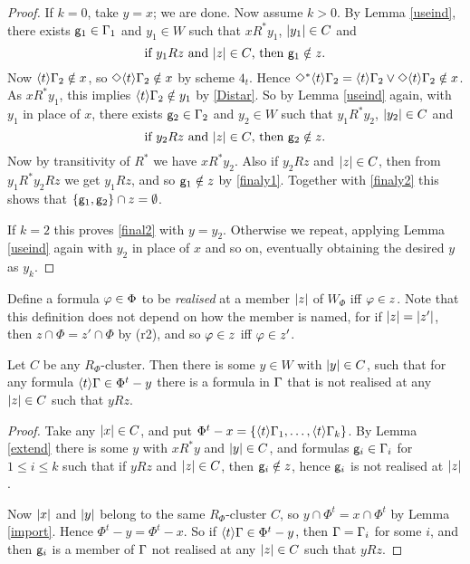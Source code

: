 \begin{proof}
If $k=0$, take $y=x$; we are done.
Now assume $k>0$.
By Lemma \ref{useind}, there exists ${\sf g}_1\in\Gamma_1$ and $y_1\in W$ such that $xR^*y_1$, $|y_1|\in C$ and
\begin{equation} \label{finaly1}
\text{if $y_1Rz$ and $\ab{z}\in C$, then $\g_1\notin z$.}
\end{equation}
Now $\langle t\rangle\Gamma_2\notin x$, so $\Diamond\langle t\rangle\Gamma_2\notin x$ by scheme $4_t$.
Hence $\Diamond^*\langle t\rangle\Gamma_2=\langle t\rangle\Gamma_2\lor\Diamond\langle t\rangle\Gamma_2\notin x$. As
$xR^*y_1$, this implies  $\langle t\rangle\Gamma_2\notin y_1$ by \eqref{Distar}.
So by Lemma \ref{useind} again, with $y_1$ in place of $x$, there exists ${\sf g}_2\in\Gamma_2$ and $y_2\in W$ such that $y_1R^*y_2$, 
$|y_2|\in C$ and
\begin{equation} \label{finaly2}
\text{if $y_2Rz$ and $\ab{z}\in C$, then $\g_2\notin z$.}
\end{equation}
Now by transitivity of $R^*$ we have $xR^*y_2$. Also if $y_2Rz$ and $|z|\in C$, then from  $y_1R^*y_2Rz$ we get $y_1Rz$, and so ${\sf g}_1\notin z$ by \eqref{finaly1}. Together with \eqref{finaly2} this shows that  $\{{\sf g}_1,{\sf g}_2\}\cap z=\emptyset$.

If $k=2$ this proves \eqref{final2} with $y=y_2$. Otherwise we repeat, applying Lemma \ref{useind} again with $y_2$ in place of $x$ and so on, eventually obtaining the desired $y$ as $y_k$.
\end{proof}

Define a formula $\varphi\in\Phi$ to be \emph{realised} at a member $|z|$ of $W_\Phi$ iff $\varphi\in z$. 
Note that this definition does not depend on how the member is  named, for if $|z|=|z'|$, then $z\cap\Phi=z'\cap\Phi$ by (r2), and so $\varphi\in z$ iff $\varphi\in z'$.

\begin{lemma}\label{notreal}
Let   $C$ be any $R_\Phi$-cluster. Then there is some $y\in W$ with $|y|\in C$, such that for any formula 
$\langle t\rangle\Gamma\in \Phi^t-y$ there is a formula in $\Gamma$ that is not realised at any $|z|\in C$ such that $yRz$.
\end{lemma}
\begin{proof}
Take any $|x|\in C$, and put
 $\Phi^t-x=\{\langle t\rangle\Gamma_1,\dots,\langle t\rangle\Gamma_k\}$. By Lemma \ref{extend} there is some $y$ with $xR^*y$ and $|y|\in C$, and  formulas ${\sf g}_i\in\Gamma_i$ for $1\leq i\leq k$ such that if $yRz$ and $|z|\in C$, then ${\sf g}_i\notin z$, hence ${\sf g}_i$ is not realised at $|z|$.
 
Now $|x|$ and $|y|$ belong to the same $R_\Phi$-cluster $C$, so $y\cap \Phi^t= x\cap\Phi^t$ by Lemma \ref{import}. Hence
 $\Phi^t-y=\Phi^t-x$.
 So if $\langle t\rangle\Gamma\in \Phi^t-y$, then $\Gamma=\Gamma_i$ for some $i$, and then ${\sf g}_i$ is a member of $\Gamma$ not realised at any $|z|\in C$ such that $yRz$.
\end{proof}


